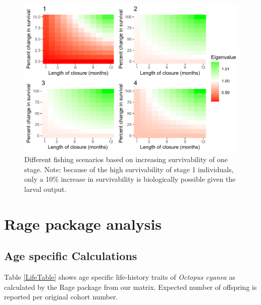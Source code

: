 \documentclass[
]{article}
\begin{document}
\begin{figure}
\centering
\includegraphics{Wulfing_CH1_Appendix_files/figure-latex/stagemo-1.pdf}
\caption{\label{fig:stagemo}Different fishing scenarios based on increasing survivability of one stage. Note: because of the high survivability of stage 1 individuals, only a 10\% increase in survivability is biologically possible given the larval output. \label{stagemo}}
\end{figure}

\hypertarget{rage-package-analysis}{%
\section{Rage package analysis}\label{rage-package-analysis}}

\hypertarget{age-specific-calculations}{%
\subsection{Age specific Calculations}\label{age-specific-calculations}}

Table \ref{LifeTable} shows age specific life-history traits of \emph{Octopus cyanea} as calculated by the Rage package from our matrix. Expected number of offspring is reported per original cohort number.
\end{document}
